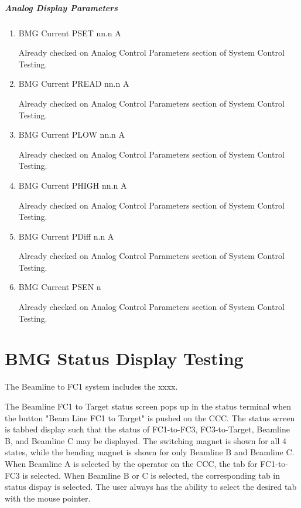\documentclass[11pt]{book}		%
\begin{document}
\paragraph{Analog Display Parameters}

\begin{enumerate}
 \item BMG Current PSET   nn.n A

\color{red}
Already checked on Analog Control Parameters section of System Control Testing.
\color{black}

 \item BMG Current PREAD  nn.n A

\color{red}
Already checked on Analog Control Parameters section of System Control Testing.
\color{black}

 \item BMG Current PLOW   nn.n A

\color{red}
Already checked on Analog Control Parameters section of System Control Testing.
\color{black}

 \item BMG Current PHIGH  nn.n A

\color{red}
Already checked on Analog Control Parameters section of System Control Testing.
\color{black}

 \item BMG Current PDiff n.n A

\color{red}
Already checked on Analog Control Parameters section of System Control Testing.
\color{black}

 \item BMG Current PSEN  n

\color{red}
Already checked on Analog Control Parameters section of System Control Testing.
\color{black}

\end{enumerate}






\chapter{BMG Status Display Testing}

The Beamline to FC1 system includes the xxxx.

The Beamline FC1 to Target status screen pops up in the status terminal when the button "Beam Line FC1 to Target" is pushed on the CCC. The status screen is tabbed display such that the status of FC1-to-FC3, FC3-to-Target, Beamline B, and Beamline C may be displayed.  The switching magnet is shown for all 4 states, while the bending magnet is shown for only Beamline B and Beamline C.  When Beamline A is selected by the operator on the CCC, the tab for FC1-to-FC3 is selected. When Beamline B or C is selected, the corresponding tab in status dispay is selected. The user always has the ability to select the desired tab with the mouse pointer.
\end{document}
